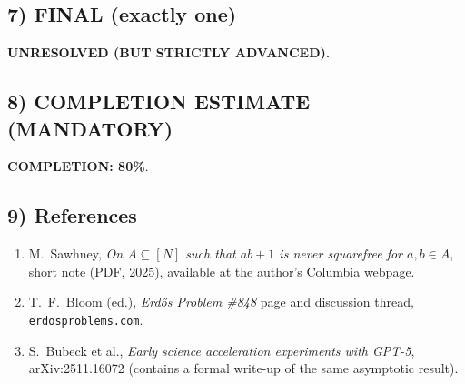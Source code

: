 \subsection*{7) FINAL (exactly one)}
\textbf{UNRESOLVED (BUT STRICTLY ADVANCED).}

\subsection*{8) COMPLETION ESTIMATE (MANDATORY)}
\textbf{COMPLETION: 80\%}.

\subsection*{9) References}
\begin{enumerate}
\item M.~Sawhney, \emph{On $A\subseteq[N]$ such that $ab+1$ is never squarefree for $a,b\in A$}, short note (PDF, 2025), available at the author's Columbia webpage.
\item T.~F.~Bloom (ed.), \emph{Erd\H{o}s Problem \#848} page and discussion thread, \texttt{erdosproblems.com}.
\item S.~Bubeck et al., \emph{Early science acceleration experiments with GPT-5}, arXiv:2511.16072 (contains a formal write-up of the same asymptotic result).
\end{enumerate}
